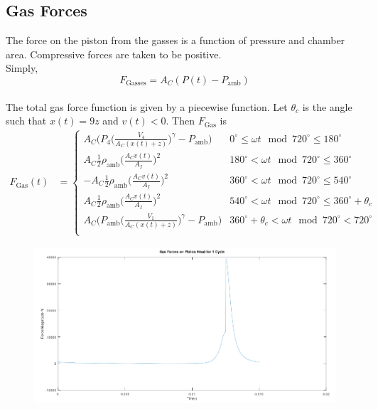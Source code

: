 \documentclass[10pt,a4paper]{article}
\begin{document}
\subsection*{Gas Forces}
The force on the piston from the gasses is a function of pressure and chamber area. Compressive forces are taken to be positive. \\
 Simply, $$F_{\text{Gasses}} = A_C (P(t) - P_{\text{amb}})$$\\
 The total gas force function is given by a piecewise function. Let $\theta_c$ is the angle such that $x(t) = 9z$ and $v(t) < 0$. Then  $F_{\text{Gas}}$ is
\begin{align*}
F_{\text{Gas}}(t) &=
\begin{cases}
A_C \Big(P_{4} \Big( \frac{V_4}{A_C (x(t)+z)} \Big)^{\gamma} - P_{\text{amb}}\Big)  & 0^\circ \leq \omega t \mod 720^\circ \leq 180^\circ \\
A_C \frac{1}{2} \rho_{\text{amb}} \Big( \frac{A_C v(t)}{A_I} \Big)^2  & 180^\circ < \omega t \mod 720^\circ \leq 360^\circ \\
- A_C \frac{1}{2} \rho_{\text{amb}} \Big( \frac{A_C v(t)}{A_I} \Big)^2  & 360^\circ < \omega t \mod 720^\circ \leq 540^\circ \\
A_C \frac{1}{2} \rho_{\text{amb}} \Big( \frac{A_C v(t)}{A_I} \Big)^2 & 540^\circ < \omega t \mod 720^\circ \leq 360^\circ + \theta_c \\
A_C \Big( P_{\text{amb}} \Big( \frac{V_1}{A_C (x(t)+z)} \Big)^{\gamma}- P_{\text{amb}}\Big)  & 360^\circ + \theta_c < \omega t \mod 720^\circ < 720^\circ \\
\end{cases}
\end{align*}
\begin{figure}[H]
		\centering
		\includegraphics[width=\textwidth]{Selection_361.png}
	\end{figure}
\end{document}
